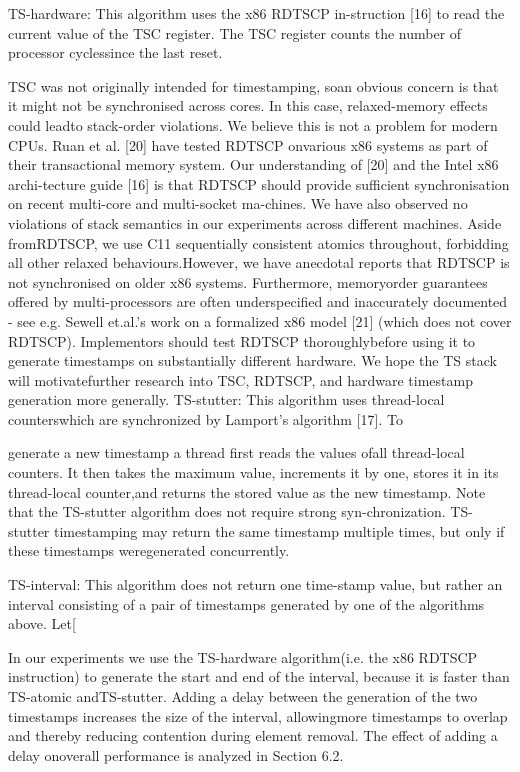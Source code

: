 TS-hardware: This algorithm uses the x86 RDTSCP in-struction [16] to read the current value of the TSC register. The TSC register counts the number of processor cyclessince the last reset.

TSC was not originally intended for timestamping, soan obvious concern is that it might not be synchronised
across cores. In this case, relaxed-memory effects could leadto stack-order violations. We believe this is not a problem
for modern CPUs. Ruan et al. [20] have tested RDTSCP onvarious x86 systems as part of their transactional memory
system. Our understanding of [20] and the Intel x86 archi-tecture guide [16] is that RDTSCP should provide sufficient
synchronisation on recent multi-core and multi-socket ma-chines. We have also observed no violations of stack semantics in our experiments across different machines. Aside fromRDTSCP, we use C11 sequentially consistent atomics throughout, forbidding all other relaxed behaviours.However, we have anecdotal reports that RDTSCP is not
synchronised on older x86 systems. Furthermore, memoryorder guarantees offered by multi-processors are often underspecified and inaccurately documented - see e.g. Sewell et.al.'s work on a formalized x86 model [21] (which does not
cover RDTSCP). Implementors should test RDTSCP thoroughlybefore using it to generate timestamps on substantially
different hardware. We hope the TS stack will motivatefurther research into TSC, RDTSCP, and hardware timestamp
generation more generally.
TS-stutter: This algorithm uses thread-local counterswhich are synchronized by Lamport's algorithm [17]. To

generate a new timestamp a thread first reads the values ofall thread-local counters. It then takes the maximum value,
increments it by one, stores it in its thread-local counter,and returns the stored value as the new timestamp. Note
that the TS-stutter algorithm does not require strong syn-chronization. TS-stutter timestamping may return the same
timestamp multiple times, but only if these timestamps weregenerated concurrently.

TS-interval: This algorithm does not return one time-stamp value, but rather an interval consisting of a pair of
timestamps generated by one of the algorithms above. Let[

In our experiments we use the TS-hardware algorithm(i.e. the x86 RDTSCP instruction) to generate the start and
end of the interval, because it is faster than TS-atomic andTS-stutter. Adding a delay between the generation of the
two timestamps increases the size of the interval, allowingmore timestamps to overlap and thereby reducing contention
during element removal. The effect of adding a delay onoverall performance is analyzed in Section 6.2.

